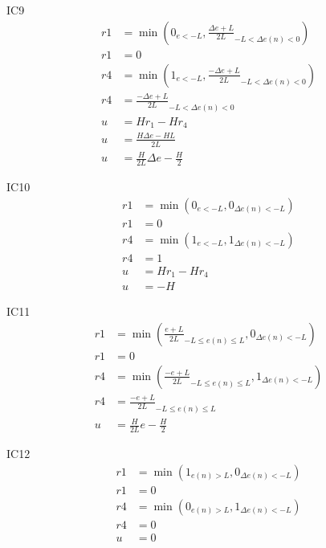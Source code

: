 IC9
\begin{equation}
\begin{split}
    r1&=\min{\left(0_{e<-L},\frac{\Delta e+L}{2L}_{-L<\Delta e(n)<0}\right)}\\
    r1&=0\\
    r4&=\min{\left(1_{e<-L},\frac{-\Delta e+L}{2L}_{-L<\Delta e(n)<0}\right)}\\
    r4&=\frac{-\Delta e+L}{2L}_{-L<\Delta e(n)<0}\\
    u&=Hr_1-Hr_4\\
    u&=\frac{H\Delta e-HL}{2L}\\
    u&=\frac{H}{2L}\Delta e-\frac{H}{2}
\end{split}
\end{equation}

IC10
\begin{equation}
\begin{split}
    r1&=\min{\left(0_{e<-L},0_{\Delta e(n)<-L}\right)}\\
    r1&=0\\
    r4&=\min{\left(1_{e<-L},1_{\Delta e(n)<-L}\right)}\\
    r4&=1\\
    u&=Hr_1-Hr_4\\
    u&=-H
\end{split}
\end{equation}

IC11
\begin{equation}
\begin{split}
    r1&=\min{\left(\frac{e+L}{2L}_{-L\leq e(n)\leq L},0_{\Delta e(n)<-L}\right)}\\
    r1&=0\\
    r4&=\min{\left(\frac{-e+L}{2L}_{-L\leq e(n)\leq L},1_{\Delta e(n)<-L}\right)}\\
    r4&=\frac{-e+L}{2L}_{-L\leq e(n)\leq L}\\
    u&=\frac{H}{2L}e-\frac{H}{2}
\end{split}
\end{equation}

IC12
\begin{equation}
\begin{split}
    r1&=\min{\left(1_{e(n)>L},0_{\Delta e(n)<-L}\right)}\\
    r1&=0\\
    r4&=\min{\left(0_{e(n)>L},1_{\Delta e(n)<-L}\right)}\\
    r4&=0\\
    u&=0
\end{split}
\end{equation}

